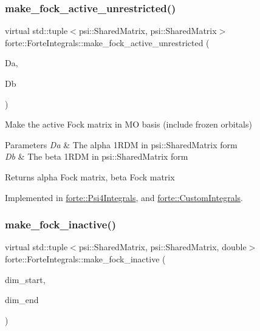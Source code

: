 \subsubsection{\texorpdfstring{make\+\_\+fock\+\_\+active\+\_\+unrestricted()}{make\_fock\_active\_unrestricted()}}
{\footnotesize\ttfamily virtual std\+::tuple$<$psi\+::\+Shared\+Matrix, psi\+::\+Shared\+Matrix$>$ forte\+::\+Forte\+Integrals\+::make\+\_\+fock\+\_\+active\+\_\+unrestricted (\begin{DoxyParamCaption}\item[{psi\+::\+Shared\+Matrix}]{Da,  }\item[{psi\+::\+Shared\+Matrix}]{Db }\end{DoxyParamCaption})\hspace{0.3cm}{\ttfamily [pure virtual]}}

Make the active Fock matrix in MO basis (include frozen orbitals) 
\begin{DoxyParams}{Parameters}
{\em Da} & The alpha 1\+R\+DM in psi\+::\+Shared\+Matrix form \\
\hline
{\em Db} & The beta 1\+R\+DM in psi\+::\+Shared\+Matrix form \\
\hline
\end{DoxyParams}
\begin{DoxyReturn}{Returns}
alpha Fock matrix, beta Fock matrix 
\end{DoxyReturn}


Implemented in \mbox{\hyperlink{classforte_1_1_psi4_integrals_a42f39301293e0b8048412cb833420797}{forte\+::\+Psi4\+Integrals}}, and \mbox{\hyperlink{classforte_1_1_custom_integrals_a87a7d17ddd89c004adf56b032d409669}{forte\+::\+Custom\+Integrals}}.

\mbox{\label{classforte_1_1_forte_integrals_a4cdca0a7587cad9d830ed3b333ec78cf}} 
\subsubsection{\texorpdfstring{make\+\_\+fock\+\_\+inactive()}{make\_fock\_inactive()}}
{\footnotesize\ttfamily virtual std\+::tuple$<$psi\+::\+Shared\+Matrix, psi\+::\+Shared\+Matrix, double$>$ forte\+::\+Forte\+Integrals\+::make\+\_\+fock\+\_\+inactive (\begin{DoxyParamCaption}\item[{psi\+::\+Dimension}]{dim\+\_\+start,  }\item[{psi\+::\+Dimension}]{dim\+\_\+end }\end{DoxyParamCaption})\hspace{0.3cm}{\ttfamily [pure virtual]}}

